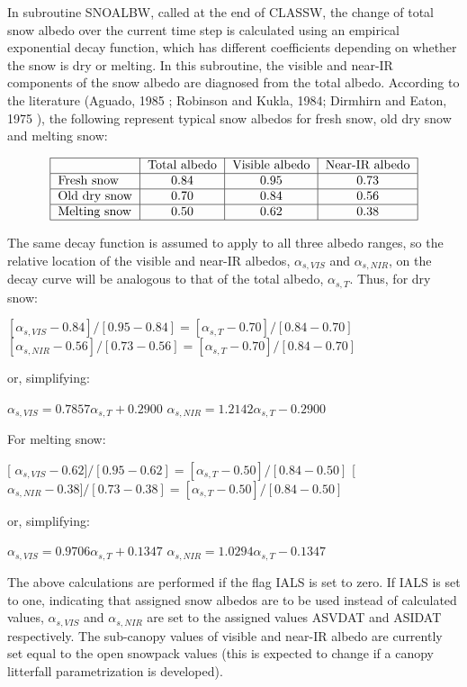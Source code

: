 In subroutine S\+N\+O\+A\+L\+B\+W, called at the end of C\+L\+A\+S\+S\+W, the change of total snow albedo over the current time step is calculated using an empirical exponential decay function, which has different coefficients depending on whether the snow is dry or melting. In this subroutine, the visible and near-\/\+I\+R components of the snow albedo are diagnosed from the total albedo. According to the literature (Aguado, 1985 \cite{Aguado1985-fv} ; Robinson and Kukla, 1984; Dirmhirn and Eaton, 1975 \cite{Dirmhirn1975-vx} ), the following represent typical snow albedos for fresh snow, old dry snow and melting snow\+:

\[ \begin{tabular} { | l | c | c | c | } \hline & Total albedo & Visible albedo & Near-IR albedo \\ \hline Fresh snow & 0.84 & 0.95 & 0.73 \\ \hline Old dry snow & 0.70 & 0.84 & 0.56 \\ \hline Melting snow & 0.50 & 0.62 & 0.38 \\ \hline \end{tabular} \]

The same decay function is assumed to apply to all three albedo ranges, so the relative location of the visible and near-\/\+I\+R albedos, $\alpha_{s,VIS}$ and $\alpha_{s,NIR}$, on the decay curve will be analogous to that of the total albedo, $\alpha_{s,T}$. Thus, for dry snow\+:

$[\alpha_{s,VIS} - 0.84]/[0.95-0.84] = [\alpha_{s,T} - 0.70]/[0.84-0.70]$ $[\alpha_{s,NIR} - 0.56]/[0.73-0.56] = [\alpha_{s,T} - 0.70]/[0.84-0.70]$

or, simplifying\+:

$\alpha_{s,VIS} = 0.7857 \alpha_{s,T} + 0.2900$ $\alpha_{s,NIR} = 1.2142 \alpha_{s,T} - 0.2900$

For melting snow\+:

\mbox{[} $\alpha_{s,VIS} - 0.62]/[0.95-0.62] = [\alpha_{s,T} - 0.50]/[0.84-0.50]$ \mbox{[} $\alpha_{s,NIR} - 0.38]/[0.73-0.38] = [\alpha_{s,T} - 0.50]/[0.84-0.50]$

or, simplifying\+:

$\alpha_{s,VIS} = 0.9706 \alpha_{s,T} + 0.1347$ $\alpha_{s,NIR} = 1.0294 \alpha_{s,T} - 0.1347$

The above calculations are performed if the flag I\+A\+L\+S is set to zero. If I\+A\+L\+S is set to one, indicating that assigned snow albedos are to be used instead of calculated values, $\alpha_{s,VIS}$ and $\alpha_{s,NIR}$ are set to the assigned values A\+S\+V\+D\+A\+T and A\+S\+I\+D\+A\+T respectively. The sub-\/canopy values of visible and near-\/\+I\+R albedo are currently set equal to the open snowpack values (this is expected to change if a canopy litterfall parametrization is developed).

